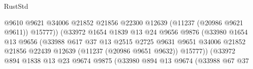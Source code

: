 \begin{lexlean}{RustStd}
\begin{coremodule}
                                              @9610
                                              @9621
                                              @34006
                                              @21852
                                              @21856
                                              @22300
                                              @12639
                                              (@11237 (@20986 @9621 @9611))
                                              @15777))
                                          (@33972
                                            @1654
                                            @1839
                                            @13
                                            @24
                                            @9656
                                            @9876
                                            (@33980
                                              @1654
                                              @13
                                              @9656
                                              (@33988
                                                @617
                                                @37
                                                @13
                                                @2515
                                                @2725
                                                @9631
                                                @9651
                                                @34006
                                                @21852
                                                @21856
                                                @22439
                                                @12639
                                                (@11237 (@20986 @9651 @9632))
                                                @15777))
                                            (@33972
                                              @894
                                              @1838
                                              @13
                                              @23
                                              @9674
                                              @9875
                                              (@33980
                                                @894
                                                @13
                                                @9674
                                                (@33988
                                                  @67
                                                  @37

\end{coremodule}
\end{lexlean}
